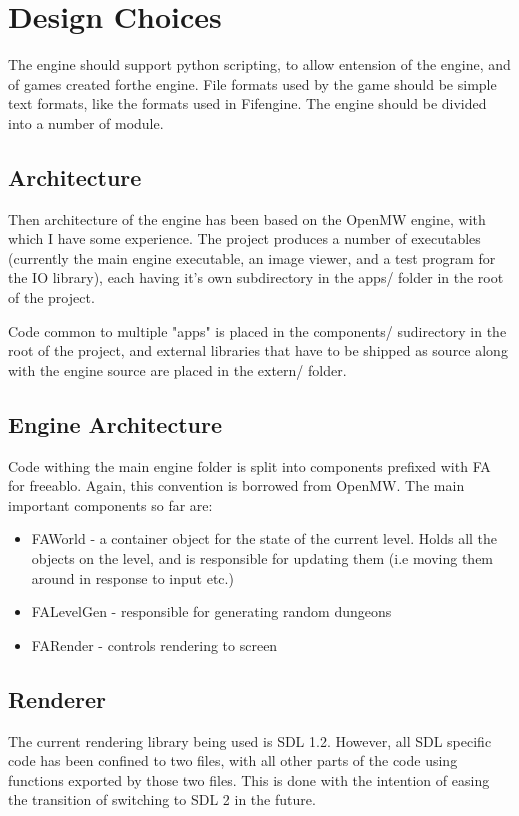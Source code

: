   \section{Design Choices}
    The engine should support python scripting, to allow entension of the engine, and of games created forthe engine.
    File formats used by the game should be simple text formats, like the formats used in Fifengine.
    The engine should be divided into a number of module.
    
    \subsection{Architecture}
    Then architecture of the engine has been based on the OpenMW\cite{openmw} engine, with which I have some experience.
    The project produces a number of executables (currently the main engine executable, an image viewer, and a test program for the IO library), each having it's own subdirectory in the apps/ folder in the root of the project.
    
    Code common to multiple "apps" is placed in the components/ sudirectory in the root of the project, and external libraries that have to be shipped as source along with the engine source are placed in the extern/ folder.
    
    \subsection{Engine Architecture}
    Code withing the main engine folder is split into components prefixed with FA for freeablo. Again, this convention is borrowed from OpenMW\cite{openmw}.
    The main important components so far are:
    \begin{itemize}
        \item{FAWorld - a container object for the state of the current level. Holds all the objects on the level, and is responsible for updating them (i.e moving them around in response to input etc.)}
        \item{FALevelGen - responsible for generating random dungeons}
        \item{FARender - controls rendering to screen}
    \end{itemize}

    \subsection{Renderer}
    The current rendering library being used is SDL 1.2. However, all SDL specific code has been confined to two files, with all other parts of the code using functions exported by those two files. This is done with the intention of easing the transition of switching to SDL 2 in the future.
    

